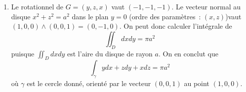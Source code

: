 \begin{enumerate}
\item 
Le rotationnel de $G = (y,z,x)$ vaut $(-1,-1,-1)$. Le vecteur normal au disque $x^2 + z^2 = a^2$ dans le plan $y = 0$ (ordre des paramètres~: $(x,z)$)vaut $(1,0,0) \wedge (0,0,1) = (0,-1,0)$. On peut donc calculer l'intégrale de
\begin{equation*}
\iint_D d x d y = \pi a^2
\end{equation*}
puisque $\iint_D d x d y$ est l'aire du disque de rayon $a$. On en conclut que
\begin{equation*}
\int_\gamma y d x + z d y + x d z = \pi a^2
\end{equation*}
où $\gamma$ est le cercle donné, orienté par le vecteur $(0,0,1)$ au point $(1,0,0)$.
\end{enumerate}

